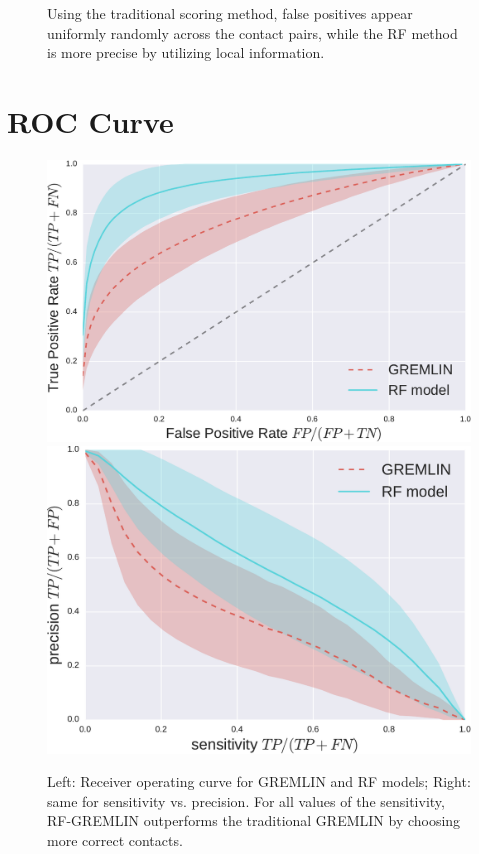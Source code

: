 \documentclass[landscape]{sciposter}
\newlength{\customfigheight}
\begin{document}
\begin{multicols}{3}
\begin{figure}
{Using the traditional scoring method, false positives appear uniformly randomly across the contact pairs, 
while the RF method is more precise  by utilizing local information.
}
\end{figure}

\vfill \columnbreak

\section*{ROC Curve}
\begin{figure}
    \center 
    \includegraphics[height=\customfigheight]{figures/GREMLIN_RF_ROC-crop.pdf}%
    \hfill%
    \includegraphics[height=\customfigheight]{figures/GREMLIN_RF_Acc_Pre-crop.pdf}%
\caption{%
Left: Receiver operating curve for GREMLIN and RF models; Right: same for sensitivity vs. precision. 
For all values of the sensitivity, RF-GREMLIN outperforms the traditional GREMLIN by choosing more correct contacts.
}

\end{figure}

\end{multicols}
\end{document}
